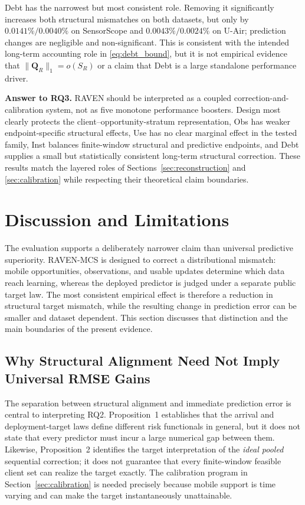 \documentclass[letterpaper,journal]{IEEEtran}
\begin{document}
Debt has the narrowest but most consistent role.  Removing it significantly
increases both structural mismatches on both datasets, but only by
$0.0141\%/0.0040\%$ on SensorScope and
$0.0043\%/0.0024\%$ on U-Air; prediction changes are negligible and
non-significant.  This is consistent with the intended long-term accounting
role in \eqref{eq:debt_bound}, but it is not empirical evidence that
$\|\mathbf Q_R\|_1=o(S_R)$ or a claim that Debt is a large standalone
performance driver.

\noindent\textbf{Answer to RQ3.}
RAVEN should be interpreted as a coupled correction-and-calibration system, not
as five monotone performance boosters.  Design most clearly protects the
client--opportunity-stratum representation, Obs has weaker endpoint-specific
structural effects, Use has no clear marginal effect in the tested family, Inst
balances finite-window structural and predictive endpoints, and Debt supplies a
small but statistically consistent long-term structural correction.  These
results match the layered roles of Sections~\ref{sec:reconstruction} and
\ref{sec:calibration} while respecting their theoretical claim boundaries.

\section{Discussion and Limitations}
\label{sec:discussion}

The evaluation supports a deliberately narrower claim than universal predictive
superiority.  RAVEN-MCS is designed to correct a distributional mismatch:
mobile opportunities, observations, and usable updates determine which data
reach learning, whereas the deployed predictor is judged under a separate
public target law.  The most consistent empirical effect is therefore a
reduction in structural target mismatch, while the resulting change in
prediction error can be smaller and dataset dependent.  This section discusses
that distinction and the main boundaries of the present evidence.

\subsection{Why Structural Alignment Need Not Imply Universal RMSE Gains}
\label{subsec:discussion_alignment_rmse}

The separation between structural alignment and immediate prediction error is
central to interpreting RQ2.  Proposition~1 establishes that the arrival and
deployment-target laws define different risk functionals in general, but it
does not state that every predictor must incur a large numerical gap between
them.  Likewise, Proposition~2 identifies the target interpretation of the
\emph{ideal pooled} sequential correction; it does not guarantee that every
finite-window feasible client set can realize the target exactly.  The
calibration program in Section~\ref{sec:calibration} is needed precisely because
mobile support is time varying and can make the target instantaneously
unattainable.
\end{document}
